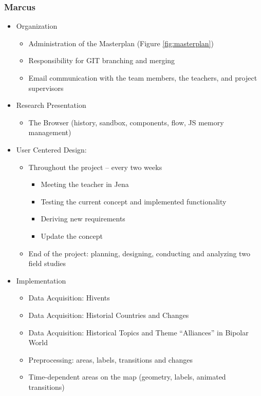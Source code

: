 \subsubsection{Marcus} %
\label{ssub:marcus}

\begin{itemize}
  \item Organization
  \begin{itemize}
    \item Administration of the Masterplan (Figure \ref{fig:masterplan})
    \item Responsibility for GIT branching and merging
    \item Email communication with the team members, the teachers, and project supervisors
  \end{itemize}
  \item Research Presentation
  \begin{itemize}
    \item The Browser (history, sandbox, components, flow, JS memory management)
  \end{itemize}
  \item User Centered Design:
  \begin{itemize}
    \item Throughout the project -- every two weeks
    \begin{itemize}
      \item Meeting the teacher in Jena
      \item Testing the current concept and implemented functionality
      \item Deriving new requirements
      \item Update the concept
    \end{itemize}
    \item End of the project: planning, designing, conducting and analyzing two field studies
  \end{itemize}
  \item Implementation
  \begin{itemize}
    \item Data Acquisition: Hivents
    \item Data Acquisition: Historial Countries and Changes
    \item Data Acquisition: Historical Topics and Theme ``Alliances'' in Bipolar World
    \item Preprocessing: areas, labels, transitions and changes
    \item Time-dependent areas on the map (geometry, labels, animated transitions)

\end{itemize}
\end{itemize}
